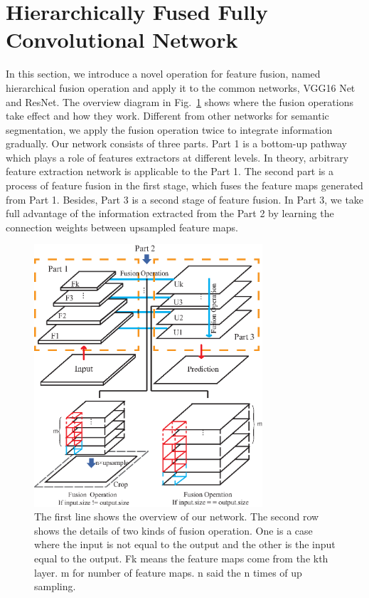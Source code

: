 \section{Hierarchically Fused Fully Convolutional Network}
\label{Sec:HF-FCN}
In this section, we introduce a novel operation for feature fusion, named hierarchical fusion operation and apply it to the common networks, VGG16 Net and ResNet. The overview diagram in Fig.~\ref{fig:Fusion-Operation} shows where the fusion operations take effect and how they work. Different from other networks for semantic segmentation, we apply the fusion operation twice to integrate information gradually.
Our network consists of three parts. Part 1 is a bottom-up pathway which plays a role of features extractors at different levels.
In theory, arbitrary feature extraction network is applicable to the Part 1.
The second part is a process of feature fusion in the first stage, which fuses the feature maps generated from Part 1.
Besides, Part 3 is a second stage of feature fusion.
In Part 3, we take full advantage of the information extracted from the Part 2 by learning the connection weights between upsampled feature maps.

\begin{figure}
\centering
\includegraphics[width=8.5cm]{Figures/Fusion_Operation.eps}
\caption{The first line shows the overview of our network. The second row shows the details of two kinds of fusion operation. One is a case where the input is not equal to the output and the other is the input equal to the output. Fk means the feature maps come from the kth layer. m for number of feature maps. n said the n times of up sampling.}
\label{fig:Fusion-Operation}
\end{figure}
